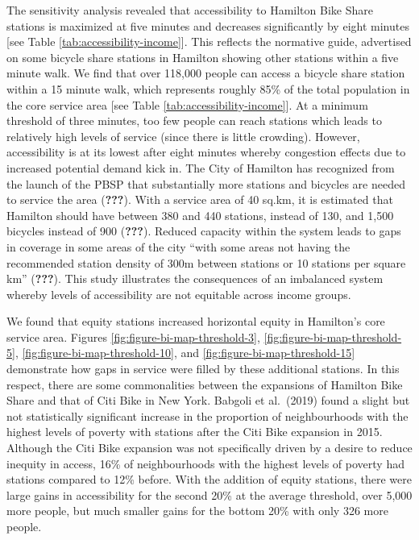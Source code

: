 \documentclass[]{elsarticle} %
\begin{document}
The sensitivity analysis revealed that accessibility to Hamilton Bike
Share stations is maximized at five minutes and decreases significantly
by eight minutes {[}see Table \ref{tab:accessibility-income}{]}. This
reflects the normative guide, advertised on some bicycle share stations
in Hamilton showing other stations within a five minute walk. We find
that over 118,000 people can access a bicycle share station within a 15
minute walk, which represents roughly 85\% of the total population in
the core service area {[}see Table \ref{tab:accessibility-income}{]}. At
a minimum threshold of three minutes, too few people can reach stations
which leads to relatively high levels of service (since there is little
crowding). However, accessibility is at its lowest after eight minutes
whereby congestion effects due to increased potential demand kick in.
The City of Hamilton has recognized from the launch of the PBSP that
substantially more stations and bicycles are needed to service the area
({\textbf{???}}). With a service area of 40 sq.km, it is estimated that
Hamilton should have between 380 and 440 stations, instead of 130, and
1,500 bicycles instead of 900 ({\textbf{???}}). Reduced capacity within
the system leads to gaps in coverage in some areas of the city ``with
some areas not having the recommended station density of 300m between
stations or 10 stations per square km'' ({\textbf{???}}). This study
illustrates the consequences of an imbalanced system whereby levels of
accessibility are not equitable across income groups.

We found that equity stations increased horizontal equity in Hamilton's
core service area. Figures \ref{fig:figure-bi-map-threshold-3},
\ref{fig:figure-bi-map-threshold-5},
\ref{fig:figure-bi-map-threshold-10}, and
\ref{fig:figure-bi-map-threshold-15} demonstrate how gaps in service
were filled by these additional stations. In this respect, there are
some commonalities between the expansions of Hamilton Bike Share and
that of Citi Bike in New York. Babgoli et al.~(2019) found a slight but
not statistically significant increase in the proportion of
neighbourhoods with the highest levels of poverty with stations after
the Citi Bike expansion in 2015. Although the Citi Bike expansion was
not specifically driven by a desire to reduce inequity in access, 16\%
of neighbourhoods with the highest levels of poverty had stations
compared to 12\% before. With the addition of equity stations, there
were large gains in accessibility for the second 20\% at the average
threshold, over 5,000 more people, but much smaller gains for the bottom
20\% with only 326 more people.
\end{document}
